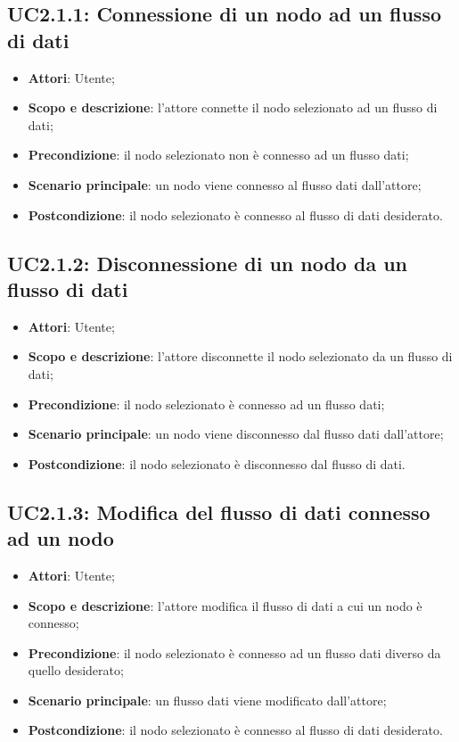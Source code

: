 \subsection{UC2.1.1: Connessione di un nodo ad un flusso di dati}
\hypertarget{UC2.1.1}{}
\begin{itemize}
	\item \textbf{Attori}: Utente;
	\item \textbf{Scopo e descrizione}: l'attore connette il nodo selezionato ad un flusso di dati;
	\item \textbf{Precondizione}: il nodo selezionato non è connesso ad un flusso dati;
	\item \textbf{Scenario principale}: un nodo viene connesso al flusso dati dall'attore;
	\item \textbf{Postcondizione}: il nodo selezionato è connesso al flusso di dati desiderato.
\end{itemize}

\subsection{UC2.1.2: Disconnessione di un nodo da un flusso di dati}
\hypertarget{UC2.1.2}{}
\begin{itemize}
	\item \textbf{Attori}: Utente;
	\item \textbf{Scopo e descrizione}: l'attore disconnette il nodo selezionato da un flusso di dati;
	\item \textbf{Precondizione}: il nodo selezionato è connesso ad un flusso dati;
	\item \textbf{Scenario principale}: un nodo viene disconnesso dal flusso dati dall'attore;
	\item \textbf{Postcondizione}: il nodo selezionato è disconnesso dal flusso di dati.
\end{itemize}

\subsection{UC2.1.3: Modifica del flusso di dati connesso ad un nodo}
\hypertarget{UC2.1.3}{}
\begin{itemize}
	\item \textbf{Attori}: Utente;
	\item \textbf{Scopo e descrizione}: l'attore modifica il flusso di dati a cui un nodo è connesso;
	\item \textbf{Precondizione}: il nodo selezionato è connesso ad un flusso dati diverso da quello desiderato;
	\item \textbf{Scenario principale}: un flusso dati viene modificato dall'attore;
	\item \textbf{Postcondizione}: il nodo selezionato è connesso al flusso di dati desiderato.
\end{itemize}
